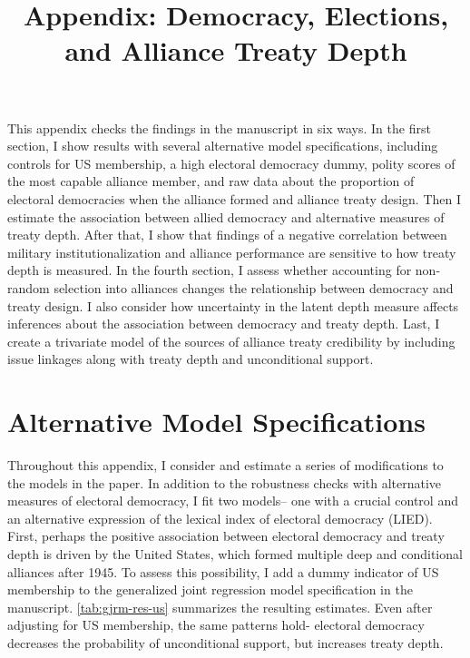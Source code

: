 \documentclass[12pt]{article}
\title{\textbf{Appendix: Democracy, Elections, and Alliance Treaty Depth}}
\author{}
\date{}
\begin{document}
\maketitle 

\doublespace 

This appendix checks the findings in the manuscript in six ways. 
In the first section, I show results with several alternative model specifications, including controls for US membership, a high electoral democracy dummy, polity scores of the most capable alliance member, and raw data about the proportion of electoral democracies when the alliance formed and alliance treaty design.
Then I estimate the association between allied democracy and alternative measures of treaty depth.
After that, I show that findings of a negative correlation between military institutionalization and alliance performance are sensitive to how treaty depth is measured. 
In the fourth section, I assess whether accounting for non-random selection into alliances changes the relationship between democracy and treaty design.   
I also consider how uncertainty in the latent depth measure affects inferences about the association between democracy and treaty depth. 
Last, I create a trivariate model of the sources of alliance treaty credibility by including issue linkages along with treaty depth and unconditional support. 


\section{Alternative Model Specifications} 


Throughout this appendix, I consider and estimate a series of modifications to the models in the paper.
In addition to the robustness checks with alternative measures of electoral democracy, I fit two models-- one with a crucial control and an alternative expression of the lexical index of electoral democracy (LIED). 
First, perhaps the positive association between electoral democracy and treaty depth is driven by the United States, which formed multiple deep and conditional alliances after 1945. 
To assess this possibility, I add a dummy indicator of US membership to the generalized joint regression model specification in the manuscript. 
\autoref{tab:gjrm-res-us} summarizes the resulting estimates. 
Even after adjusting for US membership, the same patterns hold- electoral democracy decreases the probability of unconditional support, but increases treaty depth. 
 
\end{document}
